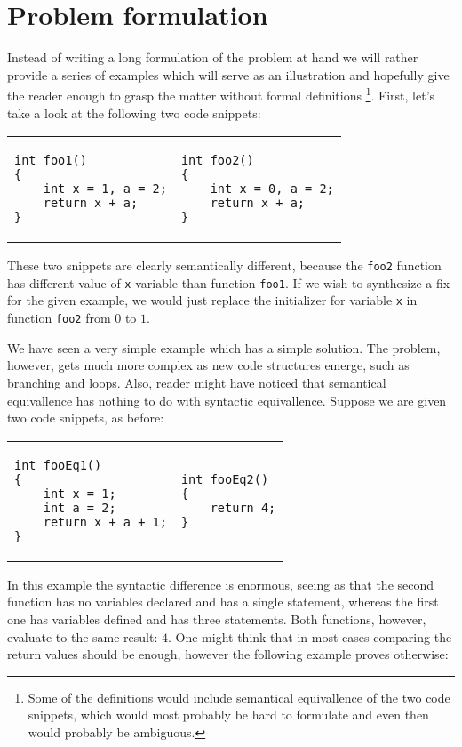 \section{Problem formulation}
\label{sec:Formulation}

Instead of writing a long formulation of the problem at hand we will rather provide a series of examples which will serve as an illustration and hopefully give the reader enough to grasp the matter without formal definitions \footnote{Some of the definitions would include semantical equivallence of the two code snippets, which would most probably be hard to formulate and even then would probably be ambiguous.}. First, let's take a look at the following two code snippets:

\begin{tabular}{ p{4.5cm} p{4.5cm} }
\begin{lstlisting}
int foo1()
{
    int x = 1, a = 2;
    return x + a;
}
\end{lstlisting}
&
\begin{lstlisting}
int foo2()
{
    int x = 0, a = 2;
    return x + a;
}
\end{lstlisting}
\end{tabular}

These two snippets are clearly semantically different, because the \texttt{foo2} function has different value of \texttt{x} variable than function \texttt{foo1}. If we wish to synthesize a fix for the given example, we would just replace the initializer for variable \texttt{x} in function \texttt{foo2}  from $0$ to $1$.

We have seen a very simple example which has a simple solution. The problem, however, gets much more complex as new code structures emerge, such as branching and loops. Also, reader might have noticed that semantical equivallence has nothing to do with syntactic equivallence. Suppose we are given two code snippets, as before:

\begin{tabular}{ p{4.5cm} p{4.5cm} }
\begin{lstlisting}
int fooEq1()
{
    int x = 1;
    int a = 2;
    return x + a + 1;
}
\end{lstlisting}
&
\begin{lstlisting}
int fooEq2()
{
    return 4;
}
\end{lstlisting}
\end{tabular}

In this example the syntactic difference is enormous, seeing as that the second function has no variables declared and has a single statement, whereas the first one has variables defined and has three statements. Both functions, however, evaluate to the same result: $4$. One might think that in most cases comparing the return values should be enough, however the following example proves otherwise:

